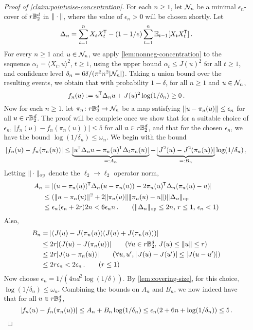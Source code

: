 \begin{proof}[Proof of \cref{claim:pointwise-concentration}]
    For each $n \geq 1$, let $\mathcal{N}_n$ be a minimal $\epsilon_n$-cover of $r\mathbb{B}^d_2$ in $\|\cdot\|$, where the value of $\epsilon_n > 0$ will be chosen shortly. Let 
    $$
        \Delta_n = \sum_{t=1}^n X_tX_t^{\mkern-1.5mu\mathsf{T}} - (1-1/e)\sum_{t=1}^n \mathbb{E}_{t-1} [X_tX_t^{\mkern-1.5mu\mathsf{T}}]\,.
    $$
    For every $n \geq 1$ and $u \in \mathcal{N}_n$, we apply \cref{lem:nonneg-concentration} to the sequence $\alpha_t = \langle X_t, u \rangle^2$, $t \geq 1$, using the upper bound $\alpha_t \leq J(u)^2$ for all $t \geq 1$, and confidence level $\delta_n = 6 \delta / (\pi^2 n^2 |\mathcal{N}_n|)$. Taking a union bound over the resulting events, we obtain that with probability $1-\delta$, for all $n \geq 1$ and $u \in \mathcal{N}_n$, 
    $$
        f_n(u) := u^{\mkern-1.5mu\mathsf{T}} \Delta_n u + J(u)^2 \log(1/\delta_n) \geq 0\,.
    $$
    Now for each $n \geq 1$, let $\pi_n \colon r\mathbb{B}^d_2 \to \mathcal{N}_n$ be a map satisfying $\|u - \pi_n(u)\| \leq \epsilon_n$ for all $u \in r\mathbb{B}^d_2$. The proof will be complete once we show that for a suitable choice of $\epsilon_n$, $|f_n(u) - f_n(\pi_n(u))| \leq 5$ for all $u \in r\mathbb{B}^d_2$, and that for the chosen $\epsilon_n$, we have the bound $\log(1/\delta_n) \leq \omega_n$. We begin with the bound
    \begin{equation*}
        |f_n(u) - f_n(\pi_n(u))| 
            \leq \underbrace{|u^{\mkern-1.5mu\mathsf{T}} \Delta_n u - \pi_n(u)^{\mkern-1.5mu\mathsf{T}} \Delta_t \pi_n(u)|}_{=:A_n} + \underbrace{|J^2(u) - J^2(\pi_n(u))|}_{=:B_n} \log (1/\delta_n)\,, 
    \end{equation*}
    Letting $\|\cdot\|_{\mathrm{op}}$ denote the $\ell_2 \to \ell_2$ operator norm,
    \begin{align*}
        A_n &= |(u - \pi_n(u))\tran \Delta_n(u-\pi_n(u)) - 2\pi_n(u)\tran \Delta_n(\pi_n(u) - u)|\\
            &\leq (\norm{u-\pi_n(u)}^2 + 2 \norm{\pi_n(u)} \norm{\pi_n(u) - u}) \norm{\Delta_n}_{\mathrm{op}} \\
            &\leq \epsilon_n(\epsilon_n + 2r)2n < 6\epsilon_n n\,. \tag{$\norm{\Delta_n}_{\mathrm{op}}\leq 2n$, $r \leq 1$, $\epsilon_n < 1$}
    \end{align*}
    Also,
    \begin{align*}
            B_n &= |(J(u) - J(\pi_n(u))(J(u) + J(\pi_n(u)))| \\
            &\leq 2r|(J(u) - J(\pi_n(u))| \tag{$\forall u \in r\Bd$, $J(u) \leq \norm{u} \leq r$} \\
            & \leq 2 r|J(u - \pi_n(u))|  \tag{$\forall u,u'$, $|J(u) - J(u')| \leq |J(u-u')|$}\\ 
            &\leq 2r \epsilon_n < 2\epsilon_n \,. \tag{$r \leq 1$}
    \end{align*}
    Now choose  $\epsilon_n = 1/(4nd^2 \log(1/\delta))$. By \cref{lem:covering-size}, for this choice, $\log(1/\delta_n) \leq \omega_n$. Combining the bounds on $A_n$ and $B_n$, we now indeed have that for all $u \in r\mathbb{B}^d_2$,
    \begin{equation*}
        |f_n(u) - f_n(\pi_n(u))| \leq A_n + B_n \log(1/\delta_n) \leq \epsilon_n (2+6n + \log(1/\delta_n))  \leq 5\,. \qedhere
    \end{equation*} 
\end{proof}